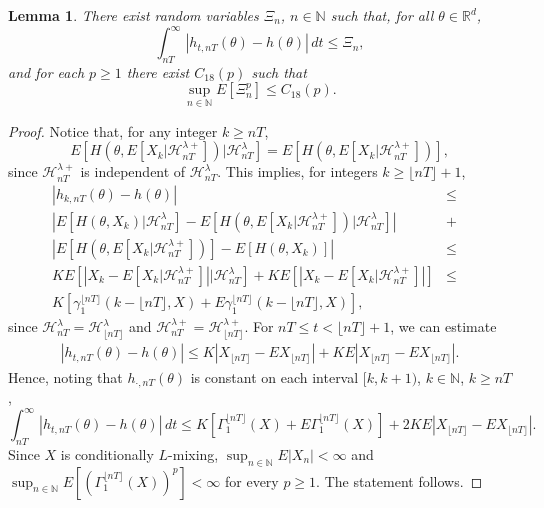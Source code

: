 \documentclass[a4paper,draft]{article}
\newtheorem{lemma}[theorem]{Lemma}
\begin{document}
\begin{lemma}\label{kkk}
There exist random variables $\Xi_n$, $n\in\mathbb{N}$ such that, for all $\theta\in\mathbb{R}^d$,
$$
\int_{nT}^{\infty}|h_{t,nT}(\theta)-h(\theta)|\, dt\leq \Xi_n,
$$
and for each $p\geq 1$ there exist $C_{18}(p)$ such that
$$
\sup_{n\in\mathbb{N}} E[\Xi_n^p]\leq C_{18}(p).
$$
\end{lemma}
\begin{proof}
Notice that, for any integer $k\geq nT$,
$$
E[H(\theta,E[X_k\vert\mathcal{H}_{nT}^{\lambda +}])\vert\mathcal{H}_{nT}^{\lambda}]=
E[H(\theta, E[X_k\vert\mathcal{H}_{nT}^{\lambda +}])],
$$
since $\mathcal{H}_{nT}^{\lambda +}$ is independent
of $\mathcal{H}_{nT}^{\lambda}$.
This implies, for integers $k\geq \lfloor nT\rfloor+1$,
\begin{eqnarray*}
|h_{k,nT}(\theta)-h(\theta)| &\leq&\\
\left|E[H(\theta,X_k)|\mathcal{H}_{nT}^{\lambda}]-
E[H(\theta,E[X_k\vert\mathcal{H}_{nT}^{\lambda+}])\vert\mathcal{H}_{nT}^{\lambda}]\right|
&+&\\
\left|E[H(\theta, E[X_k\vert\mathcal{H}_{nT}^{\lambda+}])]-E[H(\theta,X_k)]\right| &\leq&\\
KE[|X_k-E[X_k\vert\mathcal{H}_{nT}^{\lambda+}]|\vert\mathcal{H}_{nT}^{\lambda}]
+KE[|X_k-E[X_k\vert\mathcal{H}_{nT}^{\lambda+}]|] &\leq&\\
K[\gamma_1^{\lfloor nT\rfloor}(k-\lfloor nT\rfloor,X) + E\gamma_1^{\lfloor nT\rfloor}(k-\lfloor nT\rfloor,X)], & &
\end{eqnarray*}
since $\mathcal{H}^{\lambda}_{nT}=\mathcal{H}^{\lambda}_{\lfloor nT\rfloor}$
and $\mathcal{H}^{\lambda+}_{nT}=\mathcal{H}^{\lambda+}_{\lfloor nT\rfloor}$.
For $nT\leq t<\lfloor nT\rfloor+1$, we can estimate
\begin{eqnarray*}
|h_{t,nT}(\theta)-h(\theta)|\leq 
K|X_{\lfloor nT\rfloor}-EX_{\lfloor nT\rfloor}|+KE|X_{{\lfloor nT\rfloor}}-EX_{\lfloor nT\rfloor}|.
\end{eqnarray*}
Hence, noting that $h_{\cdot,nT}(\theta)$ is constant on each interval
$[k,k+1)$, $k\in\mathbb{N}$, $k\geq nT$,
$$
\int_{nT}^{\infty}|h_{t,nT}(\theta)-h(\theta)|\, dt\leq K[\Gamma_1^{\lfloor nT\rfloor}(X)
+E\Gamma_1^{\lfloor nT\rfloor}(X)]+2KE|X_{\lfloor nT\rfloor}-EX_{\lfloor nT\rfloor}|.
$$
Since $X$ is conditionally $L$-mixing, $\sup_{n\in\mathbb{N}}E|X_n|<\infty$ 
and
$\sup_{n\in\mathbb{N}}E[(\Gamma_1^{\lfloor nT\rfloor}(X))^p]<\infty$ for every $p\geq 1$. The statement follows.
\end{proof}
\end{document}
